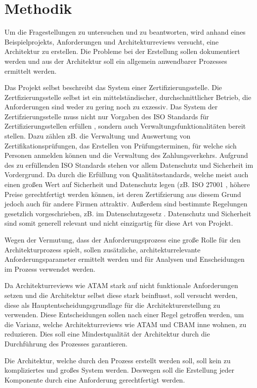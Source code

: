 \section{Methodik}
Um die Fragestellungen zu untersuchen und  zu beantworten, wird anhand eines  Beispielprojekts, Anforderungen und Architekturreviews versucht, eine Architektur zu erstellen. Die Probleme bei der Erstellung sollen dokumentiert werden und aus der Architektur soll ein allgemein anwendbarer Prozesses ermittelt werden.

Das Projekt selbst beschreibt das System einer Zertifizierungsstelle. Die Zertfizierungsstelle selbst ist ein mittelständischer, durchschnittlicher Betrieb, die Anforderungen sind weder zu gering noch zu exzessiv. Das System der Zertifzierungsstelle muss nicht nur Vorgaben des ISO Standards für Zertifizierungsstellen erfüllen \cite{ISO_CERT}, sondern auch Verwaltungsfunktionalitäten bereit stellen. Dazu zählen zB. die Verwaltung und Auswertung von Zertifikationsprüfungen, das Erstellen von Prüfungsterminen, für welche sich Personen anmelden können und die Verwaltung des Zahlungsverkehrs. Aufgrund des zu erfüllenden ISO Standards stehen vor allem Datenschutz und Sicherheit im Vordergrund. Da durch die Erfüllung von Qualitätsstandards, welche meist auch einen großen Wert auf Sicherheit und Datenschutz legen (zB. ISO 27001 \cite{ISO_SEC}, höhere Preise gerechtfertigt werden können, ist deren Zertifzierung aus diesem Grund jedoch auch für andere Firmen attraktiv. Außerdem sind bestimmte Regelungen gesetzlich vorgeschrieben, zB. im Datenschutzgesetz \cite[§ 14]{datenschutz}. Datenschutz und Sicherheit sind somit generell relevant und nicht einzigartig für diese Art von Projekt.

Wegen der Vermutung, dass der Anforderungsprozess eine große Rolle für den Architekturprozess spielt, sollen zusätzliche, architekturrelevante Anforderungsparameter ermittelt werden und für Analysen und Enscheidungen im Prozess verwendet werden.

Da Architekturreviews wie ATAM stark auf nicht funktionale Anforderungen setzen und die Architektur selbst diese stark beinflusst, soll versucht werden, diese als Hauptentscheidungsgrundlage für die Architekturerstellung zu verwenden. Diese Entscheidungen sollen nach einer Regel getroffen werden, um die Varianz, welche Architekturreviews wie ATAM und CBAM inne wohnen, zu reduzieren. Dies soll eine Mindestqualität der Architektur durch die Durchführung des Prozesses garantieren.

Die Architektur, welche durch den Prozess erstellt werden soll, soll kein zu kompliziertes und großes System werden. Deswegen soll die Erstellung jeder Komponente durch eine Anforderung gerechtfertigt werden.

